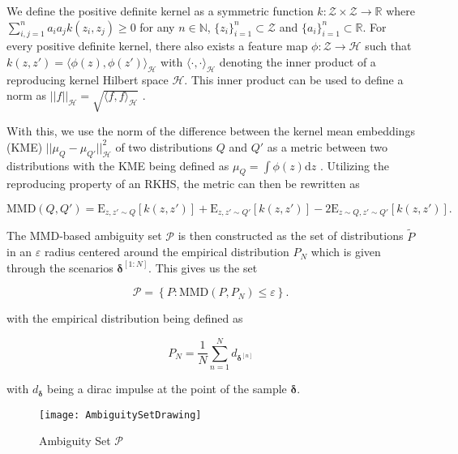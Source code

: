 We define the positive definite kernel as a symmetric function $k : \mathcal{Z} \times \mathcal{Z} \rightarrow \mathbb{R}$ where $\sum_{i,j = 1}^n a_i a_j  k(z_i, z_j) \geq 0$ for any $n \in \mathbb{N}$, $\{z_i\}_{i=1}^n \subset \mathcal{Z}$ and $\{a_i\}_{i=1}^n \subset \mathbb{R}$. For every positive definite kernel, there also exists a feature map $\phi : \mathcal{Z} \rightarrow \mathcal{H}$ such that $k(z, z') = \langle \phi (z),   \phi (z') \rangle_{\mathcal{H}}$ with $ \langle \cdot, \cdot \rangle_{\mathcal{H}}$ denoting the inner product of a reproducing kernel Hilbert space $\mathcal{H}$. This inner product can be used to define a norm as $|| f ||_{\mathcal{H}} = \sqrt{\langle f, f \rangle_{\mathcal{H}}}$ \cite{Muandet_17}.

With this, we use the norm of the difference between the kernel mean embeddings (KME) $|| \mu_Q - \mu_{Q'} ||^2_{\mathcal{H}}$ of two distributions $Q$ and $Q'$ as a metric between two distributions with the KME being defined as $\mu_Q = \int \phi(z) \text{d}z$ \cite{Arthur_12}. Utilizing the reproducing property of an RKHS, the metric can then be rewritten as 

\begin{equation} \label{MMD Kernel}
\text{MMD}(Q, Q') = \text{E}_{z,z' \sim Q}[k(z,z')] + \text{E}_{z,z' \sim Q'}[k(z,z')] - 2\text{E}_{z\sim Q, z' \sim Q'}[k(z,z')].
\end{equation}

The MMD-based ambiguity set $\mathcal{P}$ is then constructed as the set of distributions $\tilde{P}$ in an $\varepsilon$ radius centered around the empirical distribution $P_N$ which is given through the scenarios $\boldsymbol{\delta}^{[1:N]}$. This gives us the set

\begin{equation} \label{ambiguity set}
\mathcal{P} =  \left\{ P : \text{MMD} (P, P_N) \leq \varepsilon \right\}.
\end{equation}

with the empirical distribution being defined as

\begin{equation} \label{empirical distribution}
P_N = \frac{1}{N}\sum_{n = 1}^N d_{\boldsymbol{\delta}^{[n]}}
\end{equation}

with $d_{\boldsymbol{\delta}}$ being a dirac impulse at the point of the sample $\boldsymbol{\delta}$.



\begin{figure}[t]
\centering
\texttt{[image: AmbiguitySetDrawing]}
\caption{Ambiguity Set $\mathcal{P}$}
\label{AmbiguityPic}
\end{figure}

